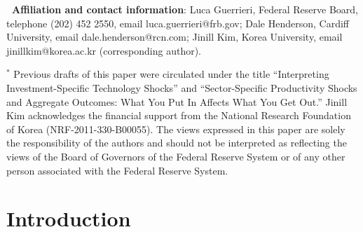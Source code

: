 \documentclass[12pt,fleqn]{article}
\renewcommand{\baselinestretch}{1.5}
\begin{document}
{\normalsize \vspace{1cm} }

\renewcommand{\baselinestretch}{1} {\footnotesize \noindent }

{\footnotesize \textbf{\ Affiliation and contact information}: Luca
Guerrieri, Federal Reserve Board, telephone (202) 452 2550, email
luca.guerrieri@frb.gov; Dale Henderson, Cardiff University, email
dale.henderson@rcn.com; Jinill Kim, Korea University, email
jinillkim@korea.ac.kr (corresponding author).}

{\footnotesize \vspace{1cm} }

{\footnotesize \noindent $^{*}$ Previous drafts of this paper were
circulated under the title ``Interpreting Investment-Specific Technology
Shocks'' and ``Sector-Specific Productivity Shocks and Aggregate Outcomes: What You Put In Affects What You Get Out.''
Jinill Kim acknowledges the financial support from the National Research Foundation of Korea (NRF-2011-330-B00055).
The views expressed in this paper are solely the responsibility of
the authors and should not be interpreted as reflecting the views of the
Board of Governors of the Federal Reserve System or of any other person
associated with the Federal Reserve System. }

\clearpage \renewcommand{\baselinestretch}{1.5} \normalsize

\section{\protect\normalsize Introduction}
\end{document}
